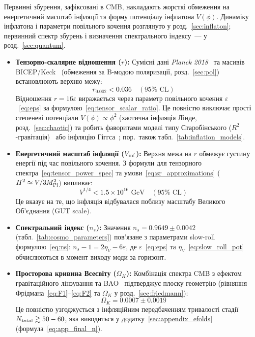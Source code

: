 Первинні збурення, зафіксовані в CMB, накладають жорсткі обмеження на енергетичний масштаб інфляції та форму потенціалу інфлатона $V(\phi)$. Динаміку інфлатона і параметри повільного кочення розглянуто у розд.~\ref{sec:inflaton}; первинний спектр збурень і визначення спектрального індексу~--- у розд.~\ref{sec:quantum}.
\begin{itemize}
    \item \textbf{Тензорно-скалярне відношення ($r$):} Сумісні дані \textit{Planck 2018}~\cite{planck_2018} та масивів BICEP/Keck~\cite{bicep_keck_2021} (обмеження за B-модою поляризації, розд.~\ref{sec:pol}) встановлюють верхню межу:
    \[ r_{0.002} < 0.036 \quad (95\% \text{ CL}) \]
    Відношення $r = 16\varepsilon$ виражається через параметр повільного кочення $\varepsilon$~\eqref{eq:eps} за формулою~\eqref{eq:tensor_scalar_ratio}. Це повністю виключає прості степеневі потенціали $V(\phi) \propto \phi^2$ (хаотична інфляція Лінде, розд.~\ref{sec:chaotic}) та робить фаворитами моделі типу Старобінського ($R^2$-гравітація)~\cite{starobinsky_1980} або інфляцію Гіггса~\cite{bezrukov_2008}; пор.~також табл.~\ref{tab:inflation_models}.

    \item \textbf{Енергетичний масштаб інфляції ($V_{\rm inf}$):} Верхня межа на $r$ обмежує густину енергії під час повільного кочення. З формули для тензорного спектра~\eqref{eq:tensor_power_spec} та умови~\eqref{eq:sr_approximations} ($H^2 \approx V/3M_{\rm Pl}^2$) випливає:
    \[ V^{1/4} < 1.5 \times 10^{16} \text{ GeV} \quad (95\% \text{ CL}) \]
    Це вказує на те, що інфляція відбувалася поблизу масштабу Великого Об'єднання (GUT scale).

    \item \textbf{Спектральний індекс ($n_s$):} Значення $n_s = 0.9649 \pm 0.0042$ (табл.~\ref{tab:cosmo_parameters}) пов'язане з параметрами slow-roll формулою~\eqref{eq:ns}: $n_s - 1 = 2\eta_V - 6\varepsilon$, де $\varepsilon$~\eqref{eq:eps} та $\eta_V$~\eqref{eq:slow_roll_pot} обчислюються в момент виходу моди за горизонт.

    \item \textbf{Просторова кривина Всесвіту ($\Omega_K$):} Комбінація спектра CMB з ефектом гравітаційного лінзування та BAO~\cite{eisenstein_2005} підтверджує плоску геометрію (рівняння Фрідмана~\eqref{eq:F1}--\eqref{eq:F2} та $\Omega_K$ у розд.~\ref{sec:friedmann}):
    \[ \Omega_K = 0.0007 \pm 0.0019 \]
    Це повністю узгоджується з інфляційним передбаченням тривалості стадії $N_{\rm total} \gtrsim 50-60$, яка виводиться у додатку~\ref{sec:appendix_efolds} (формула~\eqref{eq:app_final_n}).
\end{itemize}

